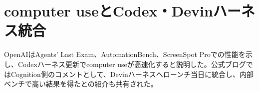 \section{computer useとCodex・Devinハーネス統合}

OpenAIはAgents' Last Exam、AutomationBench、ScreenSpot Proでの性能を示し、Codexハーネス更新でcomputer useが高速化すると説明した。公式ブログではCognition側のコメントとして、Devinハーネスへローンチ当日に統合し、内部ベンチで高い結果を得たとの紹介も共有された。


